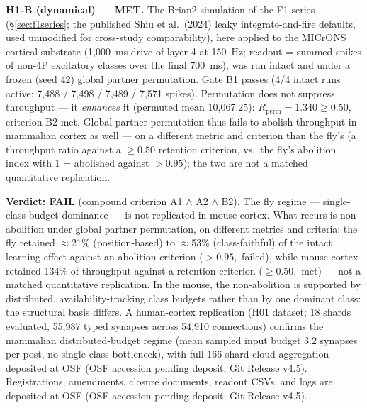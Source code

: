 \documentclass[11pt,twocolumn]{article}
\theoremstyle{plain}
\begin{document}
\textbf{H1-B (dynamical) --- MET.} The Brian2 simulation of the F1
series (\S\ref{sec:f1series}; the published Shiu et al.\ (2024) leaky
integrate-and-fire defaults, used unmodified for cross-study
comparability), here applied to the MICrONS cortical substrate
(1{,}000~ms drive of layer-4 at 150~Hz; readout = summed spikes of
non-4P excitatory classes over the final 700~ms), was run intact and
under a frozen (seed 42) global partner permutation. Gate B1 passes (4/4
intact runs active: 7{,}488 / 7{,}498 / 7{,}489 / 7{,}571 spikes).
Permutation does not suppress throughput --- it \emph{enhances} it
(permuted mean 10{,}067.25): $R_{\mathrm{perm}} = 1.340 \geq 0.50$,
criterion B2 met. Global partner permutation thus fails to abolish
throughput in mammalian cortex as well --- on a different metric and
criterion than the fly's (a throughput ratio against a $\geq 0.50$
retention criterion, vs.\ the fly's abolition index with 1 = abolished
against $>0.95$); the two are not a matched quantitative replication.

\textbf{Verdict: FAIL} (compound criterion A1 $\wedge$ A2 $\wedge$ B2).
The fly regime --- single-class budget dominance --- is not replicated in
mouse cortex. What recurs is non-abolition under global partner
permutation, on different metrics and criteria: the fly retained
$\approx$21\% (position-based) to $\approx$53\% (class-faithful) of the
intact learning effect against an abolition criterion ($>0.95,$ failed),
while mouse cortex retained 134\% of throughput against a retention
criterion ($\geq 0.50,$ met) --- not a matched quantitative replication.
In the mouse, the non-abolition is supported by distributed,
availability-tracking class budgets rather than by one dominant class:
the structural basis differs. A human-cortex replication (H01 dataset;
18 shards evaluated, 55,987 typed synapses across 54,910 connections)
confirms the mammalian distributed-budget regime (mean sampled input
budget 3.2 synapses per post, no single-class bottleneck), with full
166-shard cloud aggregation deposited at OSF (OSF accession pending deposit; Git Release v4.5).
Registrations, amendments, closure documents, readout CSVs, and
logs are deposited at OSF (OSF accession pending deposit; Git Release v4.5).
\end{document}
